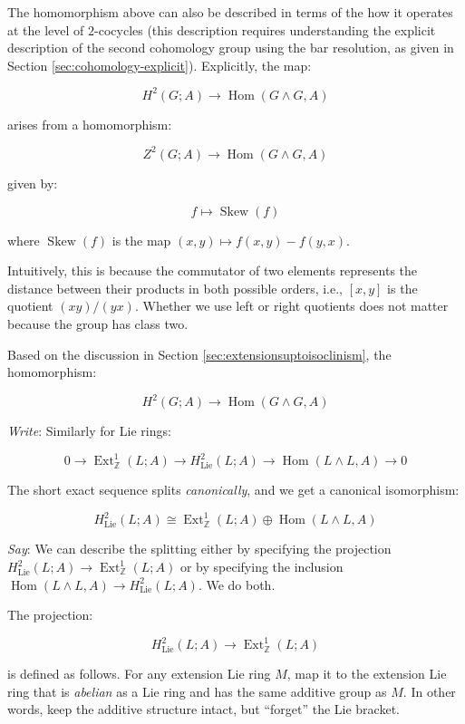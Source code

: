 \documentclass[10pt]{amsart}
\begin{document}
The homomorphism above can also be described in terms of the how it
operates at the level of $2$-cocycles (this description requires
understanding the explicit description of the second cohomology group
using the bar resolution, as given in Section
\ref{sec:cohomology-explicit}). Explicitly, the map:

$$H^2(G;A) \to \operatorname{Hom}(G \wedge G,A)$$

arises from a homomorphism:

$$Z^2(G;A) \to \operatorname{Hom}(G \wedge G,A)$$

given by:

$$f \mapsto \operatorname{Skew}(f)$$

where $\operatorname{Skew}(f)$ is the map $(x,y) \mapsto f(x,y) -
f(y,x)$.

Intuitively, this is because the commutator of two elements represents
the distance between their products in both possible orders, i.e.,
$[x,y]$ is the quotient $(xy)/(yx)$. Whether we use left or right
quotients does not matter because the group has class two.

Based on the discussion in Section \ref{sec:extensionsuptoisoclinism},
the homomorphism:

$$H^2(G;A) \to \operatorname{Hom}(G \wedge G,A)$$

{\em Write}: Similarly for Lie rings:

\begin{equation}\label{eq:ses-uct-lie-abelian}
0 \to \operatorname{Ext}^1_{\mathbb{Z}}(L;A) \to H^2_{\text{Lie}}(L;A) \to \operatorname{Hom}(L \wedge L, A) \to 0
\end{equation}

The short exact sequence splits {\em canonically}, and we get a
canonical isomorphism:

$$H^2_{\text{Lie}}(L;A) \cong \operatorname{Ext}^1_{\mathbb{Z}}(L;A) \oplus \operatorname{Hom}(L \wedge L,A)$$

{\em Say}: We can describe the splitting either by specifying the projection
$H^2_{\text{Lie}}(L;A) \to \operatorname{Ext}^1_{\mathbb{Z}}(L;A)$ or by specifying
the inclusion $\operatorname{Hom}(L \wedge L,A) \to H^2_{\text{Lie}}(L;A)$. We do both.

The projection:

$$H^2_{\text{Lie}}(L;A) \to \operatorname{Ext}^1_{\mathbb{Z}}(L;A)$$

is defined as follows. For any extension Lie ring $M$, map it to the
extension Lie ring that is {\em abelian} as a Lie ring and has the
same additive group as $M$. In other words, keep the additive
structure intact, but ``forget'' the Lie bracket.
\end{document}
